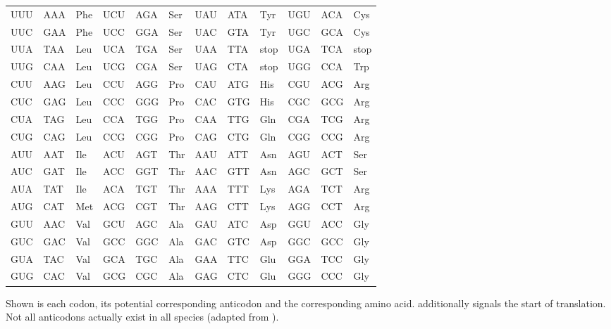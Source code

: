 \begin{table}
    \centering
    \def\s{\footnotesize{stop}}
    \begin{tabu} to 
        \toprule
        UUU & AAA & Phe & UCU & AGA & Ser & UAU & ATA & Tyr & UGU & ACA & Cys \\
        UUC & GAA & Phe & UCC & GGA & Ser & UAC & GTA & Tyr & UGC & GCA & Cys \\
        UUA & TAA & Leu & UCA & TGA & Ser & UAA & TTA & \s  & UGA & TCA & \s \\
        UUG & CAA & Leu & UCG & CGA & Ser & UAG & CTA & \s  & UGG & CCA & Trp \\
        \addlinespace
        CUU & AAG & Leu & CCU & AGG & Pro & CAU & ATG & His & CGU & ACG & Arg \\
        CUC & GAG & Leu & CCC & GGG & Pro & CAC & GTG & His & CGC & GCG & Arg \\
        CUA & TAG & Leu & CCA & TGG & Pro & CAA & TTG & Gln & CGA & TCG & Arg \\
        CUG & CAG & Leu & CCG & CGG & Pro & CAG & CTG & Gln & CGG & CCG & Arg \\
        \addlinespace
        AUU & AAT & Ile & ACU & AGT & Thr & AAU & ATT & Asn & AGU & ACT & Ser \\
        AUC & GAT & Ile & ACC & GGT & Thr & AAC & GTT & Asn & AGC & GCT & Ser \\
        AUA & TAT & Ile & ACA & TGT & Thr & AAA & TTT & Lys & AGA & TCT & Arg \\
        AUG & CAT & Met & ACG & CGT & Thr & AAG & CTT & Lys & AGG & CCT & Arg \\
        \addlinespace
        GUU & AAC & Val & GCU & AGC & Ala & GAU & ATC & Asp & GGU & ACC & Gly \\
        GUC & GAC & Val & GCC & GGC & Ala & GAC & GTC & Asp & GGC & GCC & Gly \\
        GUA & TAC & Val & GCA & TGC & Ala & GAA & TTC & Glu & GGA & TCC & Gly \\
        GUG & CAC & Val & GCG & CGC & Ala & GAG & CTC & Glu & GGG & CCC & Gly \\
        \bottomrule
    \end{tabu}
        {Shown is each codon, its potential corresponding anticodon and the
        corresponding amino acid.  additionally signals the start of
        translation. Not all anticodons actually exist in all species (adapted
        from \citet{Alberts:2002}).}
\end{table}

